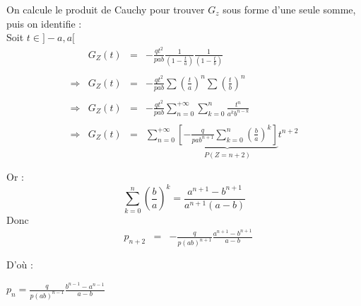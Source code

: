 On calcule le produit de Cauchy pour trouver $G_z$ sous forme d'une seule somme, puis on identifie :\\
Soit $t\in]-a, a[$
\[
  \begin{array}{rrcl}
                & G_Z(t) & = & -\frac{qt^2}{pab}\frac{1}{(1-\frac{t}{a})}\frac{1}{(1-\frac{t}{b})}                                                                          \\\\
    \Rightarrow & G_Z(t) & = & -\frac{qt^2}{pab}\sum\left(\frac{t}{a}\right)^n\sum\left(\frac{t}{b}\right)^n                                                                \\\\
    \Rightarrow & G_Z(t) & = & -\frac{qt^2}{pab}\sum\limits_{n=0}^{+\infty}\sum\limits_{k=0}^{n}\frac{t^n}{a^kb^{n-k}}                                                      \\\\
    \Rightarrow & G_Z(t) & = & \sum\limits_{n=0}^{+\infty}\underbrace{\left[-\frac{q}{pab^{n+1}}\sum\limits_{k=0}^{n}\left(\frac{b}{a}\right)^{k}\right]}_{P(Z=n+2)}t^{n+2} \\\\
  \end{array}
\]
Or :
\[
  \sum\limits_{k=0}^{n}\left(\frac{b}{a}\right)^{k} = \frac{a^{n+1} - b^{n+1}}{a^{n+1}(a-b)}
\]
Donc
\[
  \begin{array}{rrcl}
     & p_{n+2} & = & -\frac{q}{p(ab)^{n+1}} \frac{a^{n+1} - b^{n+1}}{a-b} \\\\
  \end{array}
\]
D'où :
\begin{result}
  $p_n = \frac{q}{p(ab)^{n-1}} \frac{b^{n-1}-a^{n-1}}{a-b}$
\end{result}
